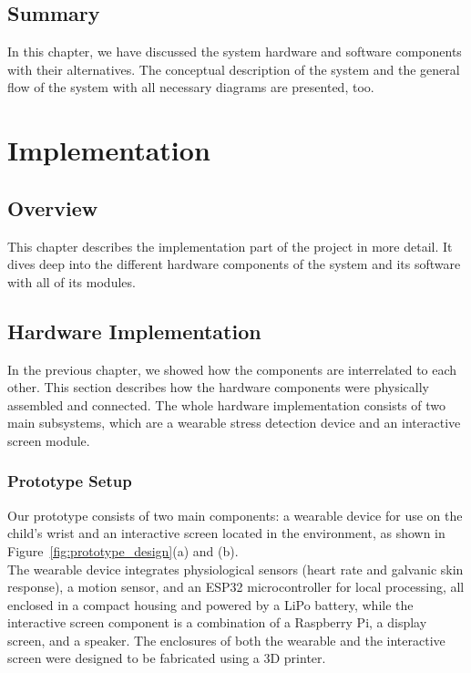 \documentclass[a4paper,12pt]{report}
\begin{document}
\section{Summary}
In this chapter, we have discussed the system hardware and software components with their alternatives. The conceptual description of the system and the general flow of the system with all necessary diagrams are presented, too.

\chapter{Implementation}
\section{Overview}
This chapter describes the implementation part of the project in more detail. It dives deep into the different hardware components of the system and its software with all of its modules.
\section{Hardware Implementation}
In the previous chapter, we showed how the components are interrelated to each other. This section describes how the hardware components were physically assembled and connected. The whole hardware implementation consists of two main subsystems, which are a wearable stress detection device and an interactive screen module.

\subsection{Prototype Setup}
Our prototype consists of  two main components: a wearable device for use on the child’s wrist and an interactive screen located in the environment, as shown in Figure~\ref{fig:prototype_design}(a) and (b).\\[0.01cm]
The wearable device integrates physiological sensors (heart rate and galvanic skin response), a motion sensor, and an ESP32 microcontroller for local processing, all enclosed in a compact housing and powered by a LiPo battery, while the interactive screen component is a combination of a Raspberry Pi, a display screen, and a speaker. The enclosures of both the wearable and the interactive screen were designed to be fabricated using a 3D printer.
\end{document}
